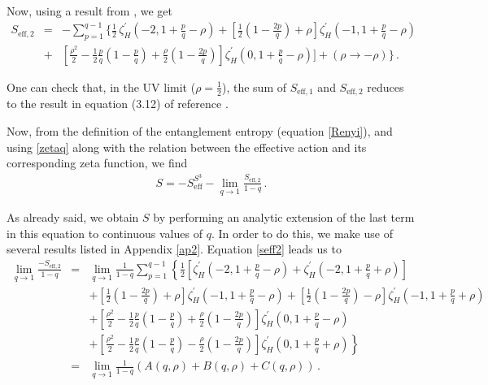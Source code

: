 \documentclass[12pt,a4paper]{article}
\newcommand{\beq}{\begin{eqnarray}}
\newcommand{\eeq}{\end{eqnarray}}
\newcommand{\nn}{\nonumber}
\numberwithin{equation}{section}
\begin{document}
Now, using a result from \cite{sri}, we get
\beq
S_{\mathrm{eff},2} &=& - \sum_{p=1}^{q-1} \Bigg\{ \frac12\, \zeta^{\prime}_H (-2, 1+\frac{p}{q}- \rho) + \left[ \frac12\left( 1-\frac{2p}{q}\right) +\rho \right] \zeta^{\prime}_H (-1, 1+\frac{p}{q}- \rho)
\nn \\
&+& \left[\frac{{\rho}^2}{2} -\frac12 \frac{p}{q}\left( 1-\frac{p}{q}\right)+\frac{{\rho}}{2}\left( 1-\frac{2p}{q}\right)\right] \zeta^{\prime}_H (0, 1+\frac{p}{q}-\rho)]+(\rho\rightarrow -\rho)\Bigg\}\,.
\label{seff2}
\eeq

One can check that, in the UV limit ($\rho=\frac12$), the sum of $S_{\mathrm{eff},1}$ and $S_{\mathrm{eff},2}$ reduces to the result in equation (3.12) of reference \cite{kleRenyi}.

Now, from the definition of the entanglement entropy (equation \eqref{Renyi}), and using \eqref{zetaq} along with the relation between the effective action and its corresponding zeta function, we find
\beq
S= - S_{\mathrm{eff}}^{S^3} -\lim_{q\rightarrow 1} \frac{S_{\mathrm{eff},2}}{1-q}\,. \label{srenyiesc}
\eeq

As already said, we obtain $S$ by performing an analytic extension of the last term in this equation to continuous values of $q$. In order to do this, we  make use of several results listed in Appendix \ref{ap2}. Equation \eqref{seff2} leads us to
\beq
\lim_{q\rightarrow 1} \frac{- S_{\mathrm{eff},2}}{1-q} &=& \lim_{q\rightarrow 1} \frac{1}{1-q} \sum_{p=1}^{q-1} \left\{ \frac12 \left[\zeta^{\prime}_H (-2, 1+\frac{p}{q}- \rho) + \zeta^{\prime}_H (-2, 1+\frac{p}{q}+ \rho)\right] \right. \nn \\
&& + \left[ \frac12\left( 1-\frac{2p}{q}\right) +\rho \right] \zeta^{\prime}_H (-1, 1+\frac{p}{q}- \rho) + \left[\frac12\left( 1-\frac{2p}{q}\right)-\rho \right] \zeta^{\prime}_H (-1, 1+\frac{p}{q}+ \rho)
\nn \\
&& + \left[\frac{{\rho}^2}{2} -\frac12 \frac{p}{q}\left( 1-\frac{p}{q}\right)+\frac{{\rho}}{2}\left( 1-\frac{2p}{q}\right)\right] \zeta^{\prime}_H (0, 1+\frac{p}{q}-\rho)\nn \\
&& + \left.\left[\frac{{\rho}^2}{2} -\frac12 \frac{p}{q}\left( 1-\frac{p}{q}\right)-\frac{{\rho}}{2}\left( 1-\frac{2p}{q}\right)\right] \zeta^{\prime}_H (0, 1+\frac{p}{q}+\rho)
\right\}\nn\\
&=& \lim_{q\rightarrow 1} \frac{1}{1-q}\left(A(q,\rho)+B(q,\rho)+C(q,\rho)\right)\,.
\eeq
\end{document}
